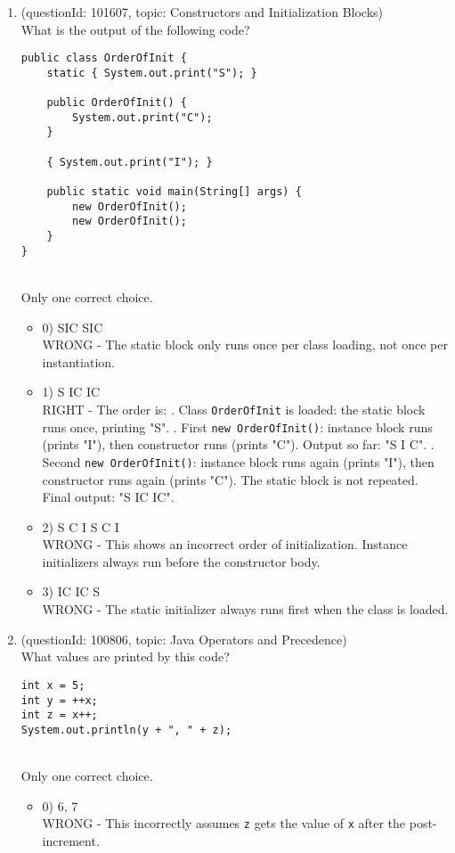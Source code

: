 \documentclass[12pt]{article}
\begin{document}
\begin{enumerate}[label=(\arabic*)]
\begin{itemize}
\end{itemize}
\item (questionId: 101607, topic: Constructors and Initialization Blocks) \\ 
What is the output of the following code?\n\begin{verbatim}
public class OrderOfInit {
    static { System.out.print("S"); }

    public OrderOfInit() {
        System.out.print("C");
    }

    { System.out.print("I"); }

    public static void main(String[] args) {
        new OrderOfInit();
        new OrderOfInit();
    }
}
\end{verbatim}
\\ \noindent Only one correct choice. 
\begin{itemize}
\item 0) SIC SIC
 \\ 
WRONG - The static block only runs once per class loading, not once per instantiation.

\item 1) S IC IC
 \\ 
RIGHT - The order is: . Class \verb|OrderOfInit| is loaded: the static block runs once, printing "S". . First \verb|new OrderOfInit()|: instance block runs (prints "I"), then constructor runs (prints "C"). Output so far: "S I C". . Second \verb|new OrderOfInit()|: instance block runs again (prints "I"), then constructor runs again (prints "C"). The static block is not repeated. \newline Final output: "S IC IC".

\item 2) S C I S C I
 \\ 
WRONG - This shows an incorrect order of initialization. Instance initializers always run before the constructor body.

\item 3) IC IC S
 \\ 
WRONG - The static initializer always runs first when the class is loaded.

\end{itemize}
\item (questionId: 100806, topic: Java Operators and Precedence) \\ 
What values are printed by this code?\n\begin{verbatim}
int x = 5;
int y = ++x;
int z = x++;
System.out.println(y + ", " + z);
\end{verbatim}
\\ \noindent Only one correct choice. 
\begin{itemize}
\item 0) 6, 7
 \\ 
WRONG - This incorrectly assumes \verb|z| gets the value of \verb|x| after the post-increment.


\end{itemize}
\end{enumerate}
\end{document}
